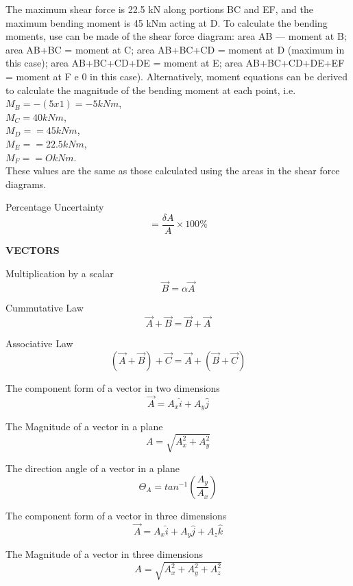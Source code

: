 \documentclass[12pt, letterpaper, twoside]{article}
\begin{document}
\bigskip


The maximum shear force is 22.5 kN along portions BC and EF, and the maximum bending moment is 45 kNm acting at D.
To calculate the bending moments, use can be made of the shear force diagram: area AB — moment at B; area AB+BC = moment at C; area AB+BC+CD = moment at D (maximum in this case); area AB+BC+CD+DE = moment at E; area AB+BC+CD+DE+EF = moment at F e 0 in this case).
Alternatively, moment equations can be derived to calculate the magnitude of the bending moment at each point, i.e.\\
$M_B = -(5x1) = -5 kNm$,\\
$M_C =  40 kNm$,\\
$M_D =  = 45 kNm$,\\
$M_E =  = 22.5 kNm$,\\
$M_F =  = O kNm$.\\
These values are the same as those calculated using the areas in the shear force diagrams.







\newpage


Percentage Uncertainty 
$$=\frac{\delta A}{A} \times 100\%$$

\vfil


\textbf{VECTORS}
$$  $$

Multiplication by a scalar
$$\overrightarrow{B}=\alpha \overrightarrow{A}$$


Cummutative Law
$$\overrightarrow{A} +\overrightarrow{B} = \overrightarrow{B} + \overrightarrow{A}$$ 


Associative Law
$$(\overrightarrow{A} + \overrightarrow{B}) + \overrightarrow{C} = \overrightarrow{A} + (\overrightarrow{B} + \overrightarrow{C})$$



The component form of a vector in two dimensions
$$\overrightarrow{A} = A_x \hat{i} + A_y \hat{j}$$




The Magnitude of a vector in a plane
$$A = \sqrt{A_x^2 + A_y^2}$$



The direction angle of a vector in a plane
$$\Theta_A = tan^{-1} \left( \frac{A_y}{A_x} \right)$$




The component form of a vector in three dimensions
$$\overrightarrow{A} = A_x \hat{i} + A_y \hat{j} + A_z \hat{k}$$


The Magnitude of a vector in three dimensions
$$A = \sqrt{A_x^2 + A_y^2 + A_z^2}$$
\end{document}
